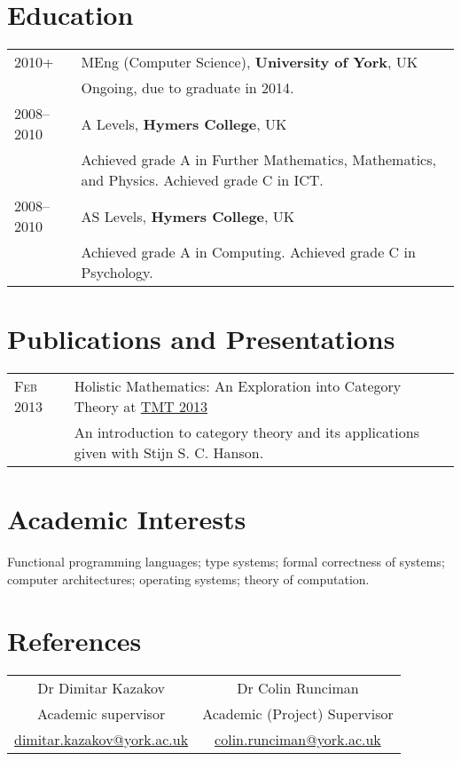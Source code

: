 \documentclass[a4paper,10pt]{article}
\newcommand{\schref}[2]{\href{#1}{\textsc{#2}}}
\newcommand{\mhref}[1]{\href{mailto:#1}{#1}}
\newenvironment{cvtable}{\begin{tabular}{x{2cm}|p{11.6cm}}}{\end{tabular}}
\newcommand{\rowhead}[1]{\textsc{#1} &}
\newcommand{\rowdetail}[1]{& \footnotesize{#1}}
\begin{document}
\section{Education}
\begin{cvtable}
  \rowhead{2010+}       MEng (Computer Science), \textbf{University of York}, UK\\
  \rowdetail{Ongoing, due to graduate in 2014.}\\

  \rowhead{2008--2010} A Levels, \textbf{Hymers College}, UK\\
  \rowdetail{Achieved grade A in Further Mathematics, Mathematics, and Physics. Achieved grade C in ICT.}\\

  \rowhead{2008--2010} AS Levels, \textbf{Hymers College}, UK\\
  \rowdetail{Achieved grade A in Computing. Achieved grade C in Psychology.}
\end{cvtable}

\section{Publications and Presentations}
\begin{cvtable}
  \rowhead{Feb 2013} Holistic Mathematics: An Exploration into Category Theory at \schref{http://mathsoc.cms.gre.ac.uk/tmt/}{TMT 2013}\\
  \rowdetail{An introduction to category theory and its applications given with Stijn S. C. Hanson.}
\end{cvtable}

\section{Academic Interests}
Functional programming languages; type systems; formal correctness of systems; computer architectures; operating systems; theory of computation.

\section{References}
\begin{tabular}{c c}
  Dr Dimitar Kazakov                 & Dr Colin Runciman\\
  Academic supervisor                & Academic (Project) Supervisor\\
  \mhref{dimitar.kazakov@york.ac.uk} & \mhref{colin.runciman@york.ac.uk}\\
\end{tabular}
\end{document}
